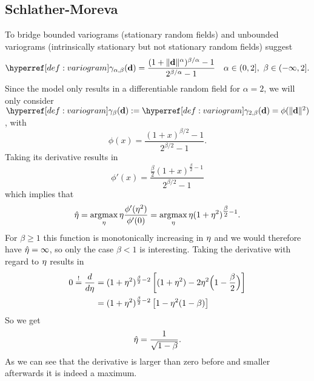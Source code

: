 
\subsection{Schlather-Moreva}

To bridge bounded variograms (stationary random fields) and
unbounded variograms (intrinsically stationary but not stationary random fields)
\textcite{schlatherParametricModelBridging2017} suggest
\begin{equation*}
	\variogram_{\alpha,\beta}(\step)
	= \frac{(1+\|\step\|^\alpha)^{\beta/\alpha}-1}{2^{\beta/\alpha}-1}
	\quad \alpha\in (0,2],\ \beta\in(-\infty, 2].
\end{equation*}
Since the model only results in a differentiable random field for \(\alpha=2\),
we will only consider \(\variogram_\beta(\step) := \variogram_{2,\beta}(\step) = \phi(\|\step\|^2)\),
with
\begin{equation*}
	\phi(x) = \frac{(1+x)^{\beta/2} -1}{2^{\beta/2}-1}.
\end{equation*}
Taking its derivative results in
\begin{equation*}
	\phi'(x) = \frac{\tfrac\beta2 (1+x)^{\tfrac\beta2 -1}}{2^{\beta/2}-1}
\end{equation*}
which implies that
\begin{align*}
	\hat{\eta} = \operatorname*{argmax}_\eta \eta\frac{\phi'(\eta^2)}{\phi'(0)}
	= \operatorname*{argmax}_\eta \eta(1+\eta^2)^{\tfrac\beta2 -1}.
\end{align*}
For \(\beta \ge 1\) this function is monotonically increasing in \(\eta\) and
we would therefore have \(\hat{\eta} = \infty\), so only the case \(\beta <1\)
is interesting. Taking the derivative with regard to
\(\eta\) results in
\begin{align*}
	0 \overset!=\frac{d}{d\eta}
	&= (1+\eta^2)^{\frac\beta2 -2} \left[(1+\eta^2) - 2\eta^2\Big(1-\frac\beta2\Big)\right]\\
	&= (1+\eta^2)^{\frac\beta2 -2} \left[1 - \eta^2(1-\beta)\right]
\end{align*}
So we get
\[
	\hat{\eta} = \frac1{\sqrt{1-\beta}}.
\]
As we can see that the derivative is larger than zero before and smaller
afterwards it is indeed a maximum.
